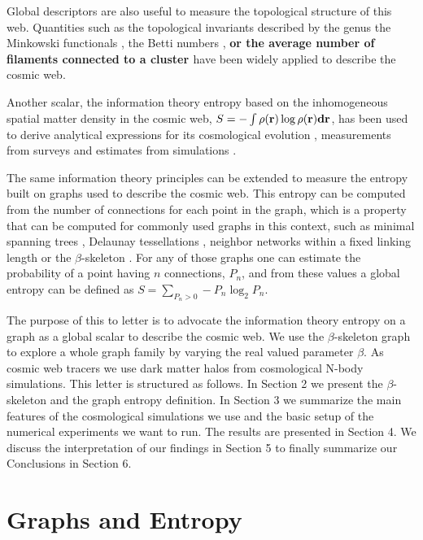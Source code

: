 \documentclass[fleqn,usenatbib]{mnras}
\begin{document}
Global descriptors are also useful to measure the topological structure of this web.
Quantities such as the topological invariants described by  the genus
\citep{1986ApJ...309....1H, 1986ApJ...306..341G} the Minkowski functionals 
\citep{1997ApJ...482L...1S}, the Betti numbers
\citep{2013JKAS...46..125P,2017MNRAS.465.4281P}, \textbf{or the average
number of filaments connected to a cluster \citep{2018MNRAS.479..973C}
} have been widely applied to describe the cosmic web. 

Another scalar, the information theory entropy based on the inhomogeneous 
spatial matter density in the cosmic web,
$S=-\int\rho(\bf{r})\log\rho(\bf{r}) d\bf{r}$, has
been used to derive analytical expressions for its cosmological evolution
\citep{2004PhRvL..92n1302H}, measurements from surveys
\citep{2015MNRAS.454.2647P}
and estimates from simulations \citep{2020MNRAS.491.5447V}.

The same information theory principles can be extended to measure the entropy built 
on graphs  used to describe the cosmic web. 
This entropy can be computed from the number of connections for each
point in the graph,  which is a property that  can be computed for commonly used graphs in
this context, such as  minimal spanning trees
\citep{1985MNRAS.216...17B}, Delaunay tessellations 
\citep{2007MNRAS.382....2R}, neighbor networks within a fixed linking
length \citep{2016MNRAS.459.2690H} or the $\beta$-skeleton
\citep{2019MNRAS.485.5276F}.   
For any of those graphs one can estimate the probability of a point
having $n$ connections, $P_n$, and from these values a global entropy
can be defined as $S = \sum_{P_n>0}-P_n\log_2{P_n}$. 

The purpose of this to letter is to advocate the information theory entropy on a graph
as a global scalar to describe the cosmic web.
We use the $\beta$-skeleton graph to explore a whole graph family 
by varying the real valued parameter $\beta$.
As cosmic web tracers we use dark matter halos from cosmological N-body simulations. 
This letter is structured as follows. 
In Section 2 we present the $\beta$-skeleton and the graph entropy definition.
In Section 3 we summarize the main features of the cosmological simulations we use and 
the basic setup of the numerical experiments we want to run.
The results are presented in Section 4.
We discuss the interpretation of our findings in Section
5 to finally summarize our Conclusions in Section 6.  

\section{Graphs and Entropy}
\end{document}
